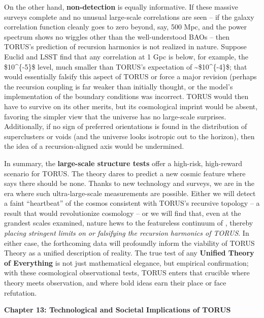 \documentclass[
]{article}
\begin{document}
{On the other hand, \textbf{non-detection} is equally informative. If
these massive surveys complete and no unusual large-scale correlations
are seen -- if the galaxy correlation function cleanly goes to zero
beyond, say, 500 Mpc, and the power spectrum shows no wiggles other than
the well-understood BAOs -- then TORUS's prediction of recursion
harmonics is not realized in nature. Suppose Euclid and LSST find that
any correlation at 1 Gpc is below, for example, the \$10\^{}\{-5\}\$
level, much smaller than TORUS's expectation of
\textasciitilde\$10\^{}\{-4\}\$; that would essentially falsify this
aspect of TORUS or force a major revision (perhaps the recursion
coupling is far weaker than initially thought, or the model's
implementation of the boundary conditions was incorrect. TORUS would
then have to survive on its other merits, but its cosmological imprint
would be absent, favoring the simpler \LambdaCDM view that the universe has no
large-scale surprises. Additionally, if no sign of preferred
orientations is found in the distribution of superclusters or voids (and
the universe looks isotropic out to the horizon), then the idea of a
recursion-aligned axis would be undermined.

In summary, the \textbf{large-scale structure tests} offer a high-risk,
high-reward scenario for TORUS. The theory dares to predict a new cosmic
feature where \LambdaCDM says there should be none. Thanks to new technology
and surveys, we are in the era where such ultra-large-scale measurements
are possible. Either we will detect a faint ``heartbeat'' of the cosmos
consistent with TORUS's recursive topology -- a result that would
revolutionize cosmology -- or we will find that, even at the grandest
scales examined, nature hews to the featureless continuum of \LambdaCDM,
thereby \emph{placing stringent limits on or falsifying the recursion
harmonics of TORUS}. In either case, the forthcoming data will
profoundly inform the viability of TORUS Theory as a unified description
of reality. The true test of any \textbf{Unified Theory of Everything}
is not just mathematical elegance, but empirical confirmation; with
these cosmological observational tests, TORUS enters that crucible where
theory meets observation, and where bold ideas earn their place or face
refutation.

\textbf{Chapter 13: Technological and Societal Implications of TORUS}

}
\end{document}
